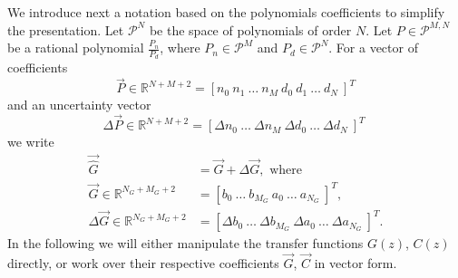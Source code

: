 \documentclass[final]{sig-alternate-05-2015}
\begin{document}
We introduce next a notation based on the polynomials coefficients to simplify 
the presentation.  Let $\mathcal{P}^{N}$ be the space of polynomials of order $N$. 
Let $P \in \mathcal{P}^{M,N}$ be a rational polynomial 
$\frac{P_n}{P_d}$, where $P_n \in \mathcal{P}^{M}$ and $P_d \in \mathcal{P}^{N}$.  
For a vector of coefficients
%
\begin{equation}
\vec{P} \in \mathbb{R}^{N+M+2}=[n_{0}\ n_{1}\ \hdots \ n_{M}\ d_{0}\ d_{1}\ \hdots\ d_{N}\ ]^T
\label{eq:coefficients}
\end{equation}
%
and an uncertainty vector 
%
\begin{equation}
\Delta{\vec{P}}\in \mathbb{R}^{N+M+2}=[\Delta{n}_{0}\ \hdots \ \Delta{n}_{M}\ \Delta{d}_{0}\ \hdots\ \Delta{d}_{N}\ ]^T \; 
\label{eq:delta_coefficients}
\end{equation}
%
we write
\begin{align}
\label{eq:hatgvector}
\vec{\hat{G}}&=\vec{G}+\Delta{\vec{G}}, \text{ where} \\
\vec{G} \in \mathbb{R}^{N_G+M_G+2}&=[b_{0}\ \hdots \ b_{M_G}\ a_{0}\ \hdots\ a_{N_G}\ ]^T, \nonumber \\
\Delta{\vec{G}}\in \mathbb{R}^{N_G+M_G+2}&=[\Delta{b}_{0}\ \hdots \ \Delta{b}_{M_G}\ \Delta{a}_{0}\ \hdots\ \Delta{a}_{N_G}\ ]^T. \nonumber
\end{align}
In the following we will either manipulate the transfer functions $G(z)$, $C(z)$ directly, 
or work over their respective coefficients $\vec{G}$, $\vec{C}$ in vector form.

\medskip
\end{document}
